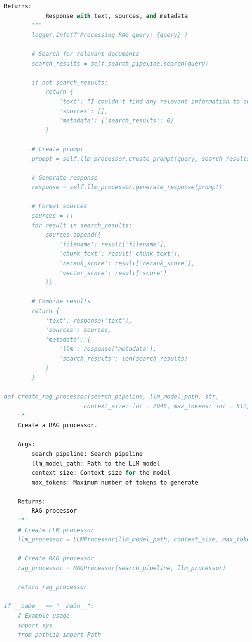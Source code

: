 \documentclass[
  screen,review,acmlarge]{acmart}
\begin{document}
\begin{lstlisting}[language=Python]
        Returns:
            Response with text, sources, and metadata
        """
        logger.info(f"Processing RAG query: {query}")
        
        # Search for relevant documents
        search_results = self.search_pipeline.search(query)
        
        if not search_results:
            return {
                'text': "I couldn't find any relevant information to answer your question.",
                'sources': [],
                'metadata': {'search_results': 0}
            }
        
        # Create prompt
        prompt = self.llm_processor.create_prompt(query, search_results)
        
        # Generate response
        response = self.llm_processor.generate_response(prompt)
        
        # Format sources
        sources = []
        for result in search_results:
            sources.append({
                'filename': result['filename'],
                'chunk_text': result['chunk_text'],
                'rerank_score': result['rerank_score'],
                'vector_score': result['score']
            })
        
        # Combine results
        return {
            'text': response['text'],
            'sources': sources,
            'metadata': {
                'llm': response['metadata'],
                'search_results': len(search_results)
            }
        }

def create_rag_processor(search_pipeline, llm_model_path: str, 
                       context_size: int = 2048, max_tokens: int = 512) -> RAGProcessor:
    """
    Create a RAG processor.
    
    Args:
        search_pipeline: Search pipeline
        llm_model_path: Path to the LLM model
        context_size: Context size for the model
        max_tokens: Maximum number of tokens to generate
        
    Returns:
        RAG processor
    """
    # Create LLM processor
    llm_processor = LLMProcessor(llm_model_path, context_size, max_tokens)
    
    # Create RAG processor
    rag_processor = RAGProcessor(search_pipeline, llm_processor)
    
    return rag_processor

if __name__ == "__main__":
    # Example usage
    import sys
    from pathlib import Path
    

\end{lstlisting}
\end{document}
